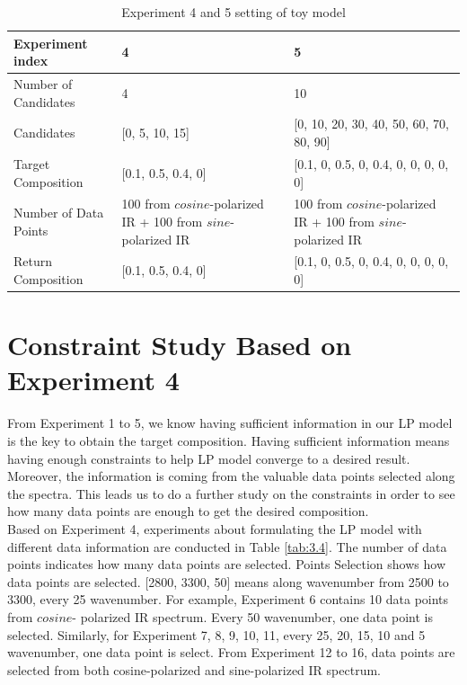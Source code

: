 \begin{table} \small 
\begin{center}
\begin{tabular}{| l | p{5cm} | l |}
\hline
Experiment index & 4 & 5\\
\hline
Number of Candidates & 4 & 10 \\
\hline
Candidates & [0, 5, 10, 15] & [0, 10, 20, 30, 40, 50, 60, 70, 80, 90] \\
\hline
Target Composition & [0.1, 0.5, 0.4, 0] & [0.1, 0, 0.5, 0, 0.4, 0, 0, 0, 0, 0]\\
\hline
Number of Data Points & 100 from $cosine$-polarized IR + 100 from $sine$-polarized IR & 100 from $cosine$-polarized IR + 100 from $sine$-polarized IR\\
\hline
Return Composition & [0.1, 0.5, 0.4, 0] & [0.1, 0, 0.5, 0, 0.4, 0, 0, 0, 0, 0] \\
\hline
\end{tabular} 
\caption{Experiment 4 and 5 setting of toy model}\label{tab:3.3}
\end{center}
\end{table}		

\section{Constraint Study Based on Experiment 4}

From Experiment 1 to 5, we know having sufficient information in our LP model is the key to obtain the target composition. Having sufficient information means having enough constraints to help LP model converge to a desired result. Moreover, the information is coming from the valuable data points selected along the spectra. This leads us to do a further study on the constraints in order to see how many data points are enough to get the desired composition.\\ 

Based on Experiment 4, experiments about formulating the LP model with different data information are conducted in Table \ref{tab:3.4}. The number of data points indicates how many data points are selected. Points Selection shows how data points are selected. [2800, 3300, 50] means along wavenumber from 2500 to 3300, every 25 wavenumber. For example, Experiment 6 contains 10 data points from $cosine$- polarized IR spectrum. Every 50 wavenumber, one data point is selected. Similarly, for Experiment 7, 8, 9, 10, 11, every 25, 20, 15, 10 and 5 wavenumber, one data point is select. From Experiment 12 to 16, data points are selected from both cosine-polarized and sine-polarized IR spectrum. \\

